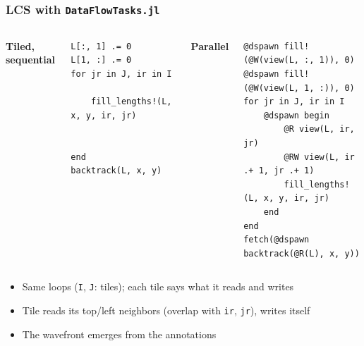 \documentclass{beamer}
\newcommand{\DFT}{\texttt{DataFlowTasks.jl}}
\begin{document}
\begin{frame}[fragile]
	\frametitle{LCS with \DFT}
	\begin{columns}[T]
		\textbf{Tiled, sequential}
		\begin{verbatim}
L[:, 1] .= 0
L[1, :] .= 0
for jr in J, ir in I

    fill_lengths!(L, x, y, ir, jr)


end
backtrack(L, x, y)
		\end{verbatim}

		\textbf{Parallel}
		\begin{verbatim}
@dspawn fill!(@W(view(L, :, 1)), 0)
@dspawn fill!(@W(view(L, 1, :)), 0)
for jr in J, ir in I
    @dspawn begin
        @R view(L, ir, jr)
        @RW view(L, ir .+ 1, jr .+ 1)
        fill_lengths!(L, x, y, ir, jr)
    end
end
fetch(@dspawn backtrack(@R(L), x, y))
		\end{verbatim}
	\end{columns}

	\vfill
	\begin{itemize}
		\item Same loops (\texttt{I}, \texttt{J}: tiles); each tile says what it \alert{reads} and \alert{writes}
		\item Tile reads its top/left neighbors (overlap with \texttt{ir}, \texttt{jr}), writes itself
		\item The wavefront \alert{emerges} from the annotations
	\end{itemize}
\end{frame}
\end{document}
